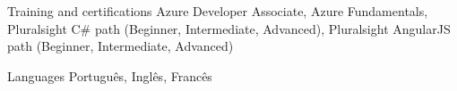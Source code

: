 \begin{cvskills}

\cvskill
{Training and certifications}
{Azure Developer Associate, Azure Fundamentals,
\newline Pluralsight C\# path (Beginner, Intermediate, Advanced),
\newline Pluralsight AngularJS path (Beginner, Intermediate, Advanced)}


\cvskill
{Languages}
{Português, Inglês, Francês}


\end{cvskills}